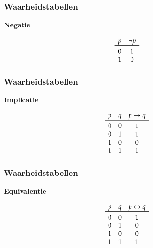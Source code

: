 \documentclass[dutch]{../khlslides}
\newcommand{\IMPLIES}{\rightarrow}
\newcommand{\IFF}{\leftrightarrow}
\newcommand{\NOT}{\neg}
\begin{document}
\begin{frame}
  \frametitle{Waarheidstabellen}
  \begin{center}
    \Large\bf Negatie
  \end{center}
  \Large
  \[
    \begin{array}{ccc}
      p & \NOT p \\
      \toprule
      0 & 1 \\
      1 & 0 \\
    \end{array}
  \]
\end{frame}

\begin{frame}
  \frametitle{Waarheidstabellen}
  \begin{center}
    \Large\bf Implicatie
  \end{center}
  \Large
  \[
    \begin{array}{ccc}
      p & q & p \IMPLIES q \\
      \toprule
      0 & 0 & 1 \\
      0 & 1 & 1 \\
      1 & 0 & 0 \\
      1 & 1 & 1 \\
    \end{array}
  \]
\end{frame}

\begin{frame}
  \frametitle{Waarheidstabellen}
  \begin{center}
    \Large\bf Equivalentie
  \end{center}
  \Large
  \[
    \begin{array}{ccc}
      p & q & p \IFF q \\
      \toprule
      0 & 0 & 1 \\
      0 & 1 & 0 \\
      1 & 0 & 0 \\
      1 & 1 & 1 \\
    \end{array}
  \]
\end{frame}
\end{document}
